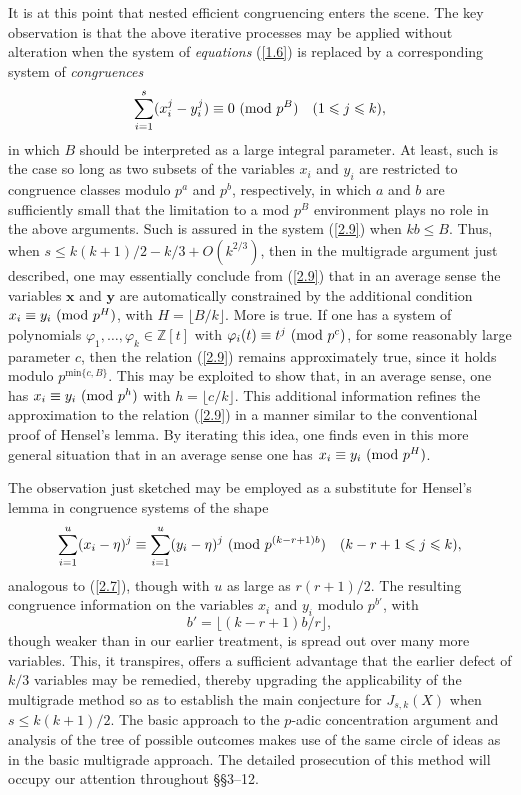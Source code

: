 \documentclass[12pt,reqno]{amsart}
\theoremstyle{definition}
\theoremstyle{remark}
\numberwithin{equation}{section}
\newcommand{\mmod}[1]{\,\,(\text{\rm mod}\,\,#1)}
\def\bfx{{\mathbf x}}
\def\bfy{{\mathbf y}}
\def\dbZ{{\mathbb Z}}\def\dbQ{{\mathbb Q}}
\def\le{\leqslant} \def\ge{\geqslant} \def\pleq{\preccurlyeq} \def\ple{\prec}
\begin{document}
It is at this point that nested efficient congruencing enters the scene. The key observation 
is that the above iterative processes may be applied without alteration when the system of 
{\it equations} (\ref{1.6}) is replaced by a corresponding system of {\it congruences}
\begin{equation}\label{2.9}
\sum_{i=1}^s(x_i^j-y_i^j)\equiv 0\mmod{p^B}\quad (1\le j\le k),
\end{equation}
in which $B$ should be interpreted as a large integral parameter. At least, such is the case 
so long as two subsets of the variables $x_i$ and $y_i$ are restricted to congruence 
classes modulo $p^a$ and $p^b$, respectively, in which $a$ and $b$ are sufficiently small 
that the limitation to a mod $p^B$ environment plays no role in the above 
arguments. Such is assured in the system (\ref{2.9}) when $kb\le B$. Thus, when 
$s\le k(k+1)/2-k/3+O(k^{2/3})$, then in the multigrade argument just described, one may 
essentially conclude from (\ref{2.9}) that in an average sense the variables $\bfx$ and 
$\bfy$ are automatically constrained by the additional condition 
$x_i\equiv y_i\mmod{p^H}$, with $H=\lfloor B/k\rfloor$. More is true. If one has a system 
of polynomials $\varphi_1,\ldots ,\varphi_k\in \dbZ[t]$ with 
$\varphi_i(t)\equiv t^j\mmod{p^c}$, for some reasonably large parameter $c$, then the 
relation (\ref{2.9}) remains approximately true, since it holds modulo 
$p^{\text{min}\{c,B\}}$. This may be exploited to show that, in an average sense, one 
has $x_i\equiv y_i\mmod{p^h}$ with $h=\lfloor c/k\rfloor$. This additional information 
refines the approximation to the relation (\ref{2.9}) in a manner similar to the 
conventional proof of Hensel's lemma. By iterating this idea, one finds even in this more 
general situation that in an average sense one has $x_i\equiv y_i\mmod{p^H}$.\par

The observation just sketched may be employed as a substitute for Hensel's lemma in 
congruence systems of the shape
$$\sum_{i=1}^u(x_i-\eta)^j\equiv \sum_{i=1}^u(y_i-\eta)^j\mmod{p^{(k-r+1)b}}\quad 
(k-r+1\le j\le k),$$
analogous to (\ref{2.7}), though with $u$ as large as $r(r+1)/2$. The resulting congruence 
information on the variables $x_i$ and $y_i$ modulo $p^{b'}$, with 
$$b'=\lfloor (k-r+1)b/r\rfloor,$$
though weaker than in our earlier treatment, is spread out over many more variables. This, 
it transpires, offers a sufficient advantage that the earlier defect of $k/3$ variables may be 
remedied, thereby upgrading the applicability of the multigrade method so as to establish 
the main conjecture for $J_{s,k}(X)$ when $s\le k(k+1)/2$. The basic approach to the 
$p$-adic concentration argument and analysis of the tree of possible outcomes makes use 
of the same circle of ideas as in the basic multigrade approach. The detailed prosecution of 
this method will occupy our attention throughout \S\S3--12.
\end{document}
